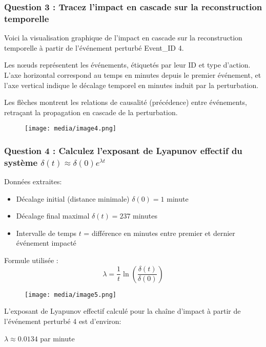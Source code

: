 \documentclass[12pt, a4paper]{article}
\begin{document}
		\subsubsection*{Question 3 : Tracez l'impact en cascade sur la reconstruction temporelle}
		
		Voici la visualisation graphique de l'impact en cascade sur la reconstruction temporelle à partir de l'événement perturbé Event\_ID 4.
		
		Les nœuds représentent les événements, étiquetés par leur ID et type d'action. L'axe horizontal correspond au temps en minutes depuis le premier événement, et l'axe vertical indique le décalage temporel en minutes induit par la perturbation.
		
		Les flèches montrent les relations de causalité (précédence) entre événements, retraçant la propagation en cascade de la perturbation.
		
		\begin{figure}[H]
			\centering
			\texttt{[image: media/image4.png]}
		\end{figure}
		
		\subsubsection*{Question 4 : Calculez l'exposant de Lyapunov effectif du système $\delta(t) \approx \delta(0)e^{\lambda t}$}
		
		Données extraites:
		\begin{itemize}
			\item Décalage initial (distance minimale) $\delta(0) = 1$ minute
			\item Décalage final maximal $\delta(t) = 237$ minutes
			\item Intervalle de temps $t$ = différence en minutes entre premier et dernier événement impacté
		\end{itemize}
		
		Formule utilisée :
		\[
		\lambda = \frac{1}{t} \ln\left(\frac{\delta(t)}{\delta(0)}\right)
		\]
		
		\begin{figure}[H]
			\centering
			\texttt{[image: media/image5.png]}
		\end{figure}
		
		L'exposant de Lyapunov effectif calculé pour la chaîne d'impact à partir de l'événement perturbé 4 est d'environ:
		
		$\lambda \approx 0.0134$ par minute
		
\end{document}
